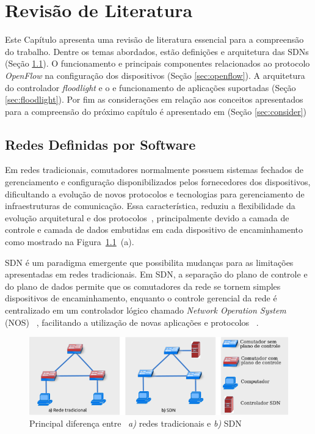 \chapter{Revisão de Literatura}
\label{cap:revisao}
Este Capítulo apresenta uma revisão de literatura essencial para a compreensão do trabalho. Dentre os temas abordados, estão definições e arquitetura das SDNs (Seção \ref{sec:sdn}). O funcionamento e principais componentes relacionados ao protocolo \textit{OpenFlow} na configuração dos dispositivos (Seção \ref{sec:openflow}). A arquitetura do controlador \textit{floodlight} e o e funcionamento de aplicações suportadas (Seção \ref{sec:floodlight}). Por fim as considerações em relação aos conceitos apresentados para a compreensão do próximo capítulo é apresentado em (Seção \ref{sec:consider})

\section{Redes Definidas por Software}
\label{sec:sdn} %

Em redes tradicionais, comutadores normalmente possuem sistemas fechados de gerenciamento e configuração disponibilizados pelos fornecedores dos dispositivos, dificultando a evolução de novos protocolos e tecnologias para gerenciamento de infraestruturas de comunicação. Essa característica, reduziu a flexibilidade da evolução arquitetural e dos protocolos~\cite{handley2006internet}, principalmente devido a camada de controle e camada de dados embutidas em cada dispositivo de encaminhamento como mostrado na Figura~\ref{fig:control_data_plane}~(a). 

SDN é um paradigma emergente que possibilita mudanças para as limitações apresentadas em redes tradicionais. Em SDN, a separação do plano de controle e do plano de dados permite que os comutadores da rede se tornem simples dispositivos de encaminhamento, enquanto o controle gerencial da rede é centralizado em um controlador lógico chamado \emph{Network  Operation  System} (NOS) ~\cite{kreutz2015}, facilitando a utilização de novas aplicações e protocolos ~\cite{nunes-2014}. 

\begin{figure}[!htb]
	\caption{\label{fig:control_data_plane}Principal diferença entre ~\textit{a)} redes tradicionais e \textit{b)} SDN}
	\begin{center}
	    \includegraphics[scale=0.9]{imagens/diferenca.png}
	\end{center}
\end{figure}


